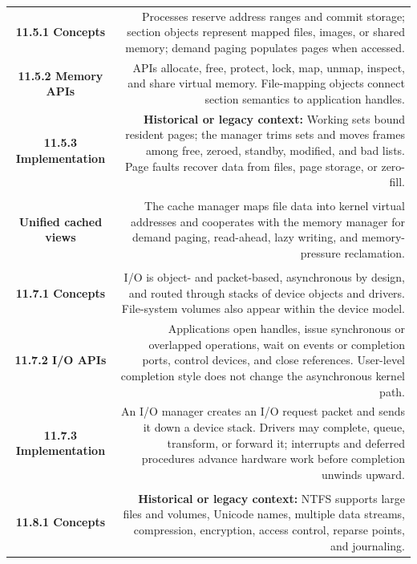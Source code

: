 \documentclass[10pt,letterpaper]{article}
\begin{document}
\begin{longtable}{C N}
\\*\hline
\textbf{11.5.1 Concepts} & Processes reserve address ranges and commit storage; section objects represent mapped files, images, or shared memory; demand paging populates pages when accessed.\\\hline
\textbf{11.5.2 Memory APIs} & APIs allocate, free, protect, lock, map, unmap, inspect, and share virtual memory. File-mapping objects connect section semantics to application handles.\\\hline
\textbf{11.5.3 Implementation} & \textcolor{legacy}{\textbf{Historical or legacy context:}} Working sets bound resident pages; the manager trims sets and moves frames among free, zeroed, standby, modified, and bad lists. Page faults recover data from files, page storage, or zero-fill.\\\hline
{}\\*\hline
\textbf{Unified cached views} & The cache manager maps file data into kernel virtual addresses and cooperates with the memory manager for demand paging, read-ahead, lazy writing, and memory-pressure reclamation.\\\hline
{}\\*\hline
\textbf{11.7.1 Concepts} & I/O is object- and packet-based, asynchronous by design, and routed through stacks of device objects and drivers. File-system volumes also appear within the device model.\\\hline
\textbf{11.7.2 I/O APIs} & Applications open handles, issue synchronous or overlapped operations, wait on events or completion ports, control devices, and close references. User-level completion style does not change the asynchronous kernel path.\\\hline
\textbf{11.7.3 Implementation} & An I/O manager creates an I/O request packet and sends it down a device stack. Drivers may complete, queue, transform, or forward it; interrupts and deferred procedures advance hardware work before completion unwinds upward.\\\hline
{}\\*\hline
\textbf{11.8.1 Concepts} & \textcolor{legacy}{\textbf{Historical or legacy context:}} NTFS supports large files and volumes, Unicode names, multiple data streams, compression, encryption, access control, reparse points, and journaling.\\\hline

\end{longtable}
\end{document}

